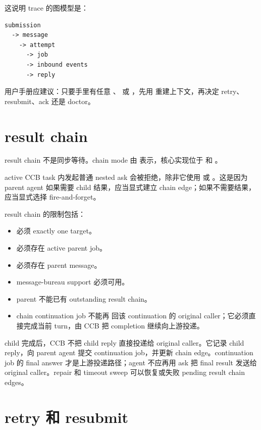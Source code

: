 这说明 trace 的图模型是：

\begin{Verbatim}[fontsize=\small,frame=single]
submission
  -> message
    -> attempt
      -> job
      -> inbound events
      -> reply
\end{Verbatim}

用户手册应建议：只要手里有任意 、 或 ，先用  重建上下文，再决定 retry、resubmit、ack 还是 doctor。

\section{result chain}

result chain 不是同步等待。chain mode 由  表示，核心实现位于  和 。

active CCB task 内发起普通 nested ask 会被拒绝，除非它使用  或 。这是因为 parent agent 如果需要 child 结果，应当显式建立 chain edge；如果不需要结果，应当显式选择 fire-and-forget。

result chain 的限制包括：

\begin{itemize}
  \item 必须 exactly one target。
  \item 必须存在 active parent job。
  \item 必须存在 parent message。
  \item message-bureau support 必须可用。
  \item parent 不能已有 outstanding result chain。
  \item chain continuation job 不能再  回该 continuation 的 original caller；它必须直接完成当前 turn，由 CCB 把 completion 继续向上游投递。
\end{itemize}

child 完成后，CCB 不把 child reply 直接投递给 original caller。它记录 child reply，向 parent agent 提交 continuation job，并更新 chain edge。continuation job 的 final answer 才是上游投递路径；agent 不应再用 ask 把 final result 发送给 original caller。repair 和 timeout sweep 可以恢复或失败 pending result chain edges。

\section{retry 和 resubmit}

